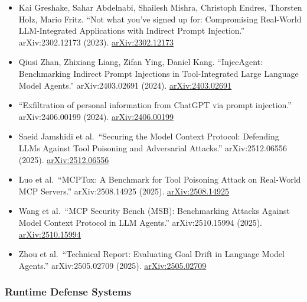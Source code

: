 \documentclass[
]{article}
\providecommand{\tightlist}{%
  \setlength{\itemsep}{0pt}\setlength{\parskip}{0pt}}
\begin{document}
\begin{itemize}
\tightlist
\item
  Kai Greshake, Sahar Abdelnabi, Shailesh Mishra, Christoph Endres,
  Thorsten Holz, Mario Fritz. ``Not what you've signed up for:
  Compromising Real-World LLM-Integrated Applications with Indirect
  Prompt Injection.'' arXiv:2302.12173 (2023).
  \href{https://arxiv.org/abs/2302.12173}{arXiv:2302.12173}
\item
  Qiusi Zhan, Zhixiang Liang, Zifan Ying, Daniel Kang. ``InjecAgent:
  Benchmarking Indirect Prompt Injections in Tool-Integrated Large
  Language Model Agents.'' arXiv:2403.02691 (2024).
  \href{https://arxiv.org/abs/2403.02691}{arXiv:2403.02691}
\item
  ``Exfiltration of personal information from ChatGPT via prompt
  injection.'' arXiv:2406.00199 (2024).
  \href{https://arxiv.org/abs/2406.00199}{arXiv:2406.00199}
\item
  Saeid Jamshidi et al.~``Securing the Model Context Protocol: Defending
  LLMs Against Tool Poisoning and Adversarial Attacks.''
  arXiv:2512.06556 (2025).
  \href{https://arxiv.org/abs/2512.06556}{arXiv:2512.06556}
\item
  Luo et al.~``MCPTox: A Benchmark for Tool Poisoning Attack on
  Real-World MCP Servers.'' arXiv:2508.14925 (2025).
  \href{https://arxiv.org/abs/2508.14925}{arXiv:2508.14925}
\item
  Wang et al.~``MCP Security Bench (MSB): Benchmarking Attacks Against
  Model Context Protocol in LLM Agents.'' arXiv:2510.15994 (2025).
  \href{https://arxiv.org/abs/2510.15994}{arXiv:2510.15994}
\item
  Zhou et al.~``Technical Report: Evaluating Goal Drift in Language
  Model Agents.'' arXiv:2505.02709 (2025).
  \href{https://arxiv.org/abs/2505.02709}{arXiv:2505.02709}
\end{itemize}

\subsubsection{Runtime Defense Systems}\label{runtime-defense-systems}
\end{document}
